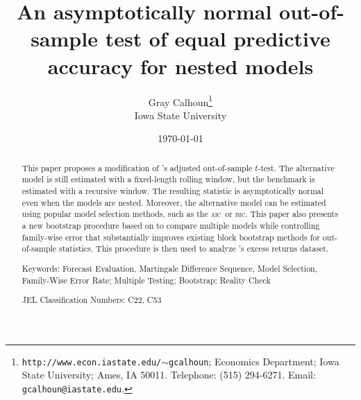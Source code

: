 \documentclass[12pt]{article}
\newcommand\citepos[2][]{\citeauthor{#2}'s \citeyearpar[#1]{#2}}
\theoremstyle{definition}
\newcommand{\aic}{\textsc{aic}}
\newcommand{\bic}{\textsc{bic}}
\begin{document}
\author{Gray
  Calhoun\thanks{\texttt{http://www.econ.iastate.edu/$\sim$gcalhoun};
    Economics Department; Iowa State University; Ames, IA 50011.
    Telephone: (515) 294-6271.  Email: \texttt{gcalhoun@iastate.edu}.}
  \\ Iowa State University}

\title{An asymptotically normal out-of-sample
  test of equal predictive accuracy for nested models} \date{\today}
\maketitle

\begin{abstract} 
  \noindent This paper proposes a modification of \citepos[\textit{J.
      Econom.}]{ClW:07} adjusted out-of-sample $t$-test.  The
  alternative model is still estimated with a fixed-length rolling
  window, but the benchmark is estimated with a recursive window. The
  resulting statistic is asymptotically normal even when the models
  are nested.  Moreover, the alternative model can be estimated using
  popular model selection methods, such as the \aic\ or \bic.  This
  paper also presents a new bootstrap procedure based on
  \citet[\textit{Econometrica}]{RoW:05} to compare multiple models
  while controlling family-wise error that substantially improves
  existing block bootstrap methods for out-of-sample statistics.  This
  procedure is then used to analyze
  \citepos[\textit{Rev. Finan. Stud.}]{GoW:08} excess returns dataset.

\strut

\noindent Keywords: Forecast Evaluation, Martingale Difference
Sequence, Model Selection, Family-Wise Error Rate; Multiple Testing;
Bootstrap; Reality Check

\strut

\noindent JEL Classification Numbers: C22, C53

\end{abstract}
\end{document}
